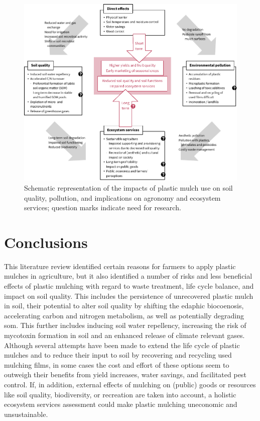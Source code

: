 \begin{figure}[t]
	\centering
	\includegraphics[width=\textwidth]{figures/mulching-overview}
	\caption[Schematic representation of the impacts of plastic mulch use on soil quality, pollution, and implications on agronomy and ecosystem services.]{Schematic representation of the impacts of plastic mulch use on soil quality, pollution, and implications on agronomy and ecosystem services; question marks indicate need for research.}
	\label{fig:mulching-overview}
	\forcerectofloat
\end{figure}

\section{Conclusions}
\label{sec:plastic-mulching:conclusions}

This literature review identified certain reasons for farmers to apply plastic mulches in agriculture, but it also identified a number of risks and less beneficial effects of plastic mulching with regard to waste treatment, life cycle balance, and impact on soil quality. This includes the persistence of unrecovered plastic mulch in soil, their potential to alter soil quality by shifting the edaphic biocoenosis, accelerating carbon and nitrogen metabolism, as well as potentially degrading \ac{som}. This further includes inducing soil water repellency, increasing the risk of mycotoxin formation in soil and an enhanced release of climate relevant gases. Although several attempts have been made to extend the life cycle of plastic mulches and to reduce their input to soil by recovering and recycling used mulching films, in some cases the cost and effort of these options seem to outweigh their benefits from yield increases, water savings, and facilitated pest control. If, in addition, external effects of mulching on (public) goods or resources like soil quality, biodiversity, or recreation are taken into account, a holistic ecosystem services assessment could make plastic mulching uneconomic and unsustainable.

